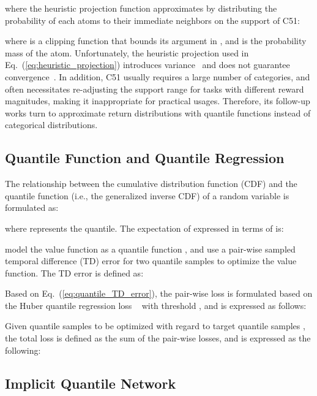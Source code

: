 \documentclass[twoside,11pt]{article}
\begin{document}
where the heuristic projection function  approximates  by distributing the probability of each atoms to their immediate neighbors on the support of C51:

where  is a clipping function that bounds its argument in , and  is the probability mass of the  atom. Unfortunately, the heuristic projection used in Eq.~(\ref{eq:heuristic_projection}) introduces variance~\citep{Rowland2019ER-DQN} and does not guarantee convergence~\citep{Dabney2018QR-DQN}. 
In addition, C51 usually requires a large number of categories, and often necessitates re-adjusting the support range for tasks with different reward magnitudes, making it inappropriate for practical usages.
Therefore, its follow-up works turn to approximate return distributions with quantile functions instead of categorical distributions.



\subsection{Quantile Function and Quantile Regression}
\label{subsec:background_quantile_function_and_quantile_regression}

The relationship between the cumulative distribution function (CDF)  and the quantile function  (i.e., the generalized inverse CDF) of a random variable  is formulated as:

where  represents the quantile. The expectation of  expressed in terms of  is:

\cite{Dabney2018IQN} model the value function as a quantile function ,
and use a pair-wise sampled temporal difference (TD) error  for two quantile samples  to optimize the value function. The TD error 
is defined as:

Based on Eq.~(\ref{eq:quantile_TD_error}), the pair-wise loss  is formulated based on the Huber quantile regression loss ~\citep{Dabney2018QR-DQN} with threshold , and is expressed as follows:


Given  quantile samples  to be optimized with regard to   target quantile samples , the total loss   is defined as the sum of the pair-wise losses, and is expressed as the following:




\subsection{Implicit Quantile Network}
\label{subsec:background_implicit_quantile_network}
\end{document}
